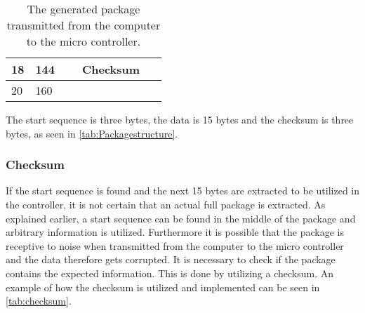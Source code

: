 \begin{table}[H]
\begin{tabular}{llclllllllllllllll}
\multicolumn{1}{|l|}{18}   & \multicolumn{1}{l|}{144} & \multicolumn{16}{c|}{Checksum}                                                                                                                                                                                                                                                                                                                                                                                      \\ \hline
\multicolumn{1}{|l|}{20}   & \multicolumn{1}{l|}{160} & \multicolumn{8}{c|}{}                                                                                                                                                                                 & \multicolumn{1}{l|}{}  & \multicolumn{1}{l|}{}  & \multicolumn{1}{l|}{}   & \multicolumn{1}{l|}{}   & \multicolumn{1}{l|}{}   & \multicolumn{1}{l|}{}   & \multicolumn{1}{l|}{}   & \multicolumn{1}{l|}{}   \\ \hline
\end{tabular}
\caption{The generated package transmitted from the computer to the micro controller.}
\label{tab:Packagestructure}
\end{table}

The start sequence is three bytes, the data is 15 bytes and the checksum is three bytes, as seen in \autoref{tab:Packagestructure}.
\subsubsection{Checksum}
If the start sequence is found and the next 15 bytes are extracted to be utilized in the controller, it is not certain that an actual full package is extracted. As explained earlier, a start sequence can be found in the middle of the package and arbitrary information is utilized. Furthermore it is possible that the package is receptive to noise when transmitted from the computer to the micro controller and the data therefore gets corrupted. It is necessary to check if the package contains the expected information. This is done by utilizing a checksum. An example of how the checksum is utilized and implemented can be seen in \autoref{tab:checksum}.  




